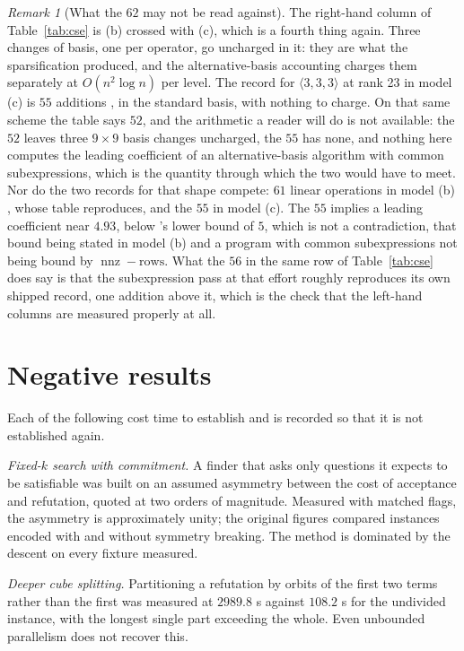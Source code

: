 \documentclass[11pt,reqno]{amsart}
\theoremstyle{plain}
\theoremstyle{definition}
\theoremstyle{remark}
\newtheorem{remark}[theorem]{Remark}
\newcommand{\nnz}{\operatorname{nnz}}
\begin{document}
\begin{remark}[What the $62$ may not be read against]
The right-hand column of Table~\ref{tab:cse} is (b) crossed with (c), which is a
fourth thing again. Three changes of basis, one per operator, go uncharged in it:
they are what the sparsification produced, and the alternative-basis accounting
charges them separately at $O(n^{2}\log n)$ per level. The record for
$\langle 3,3,3\rangle$ at rank 23 in model (c) is $55$ additions
\cite{karunaratne2026}, in the standard basis, with nothing to charge. On that
same scheme the table says $52$, and the arithmetic a reader will do is not
available: the $52$ leaves three $9\times 9$ basis changes uncharged, the $55$ has
none, and nothing here computes the leading coefficient of an alternative-basis
algorithm with common subexpressions, which is the quantity through which the two
would have to meet. Nor do the two records for that shape compete: $61$ linear
operations in model (b) \cite{beniamini2020}, whose table \cite{holtz2025}
reproduces, and the $55$ in model (c). The $55$ implies a leading coefficient
near $4.93$, below \cite{holtz2025}'s lower bound of $5$, which is not a
contradiction, that bound being stated in model (b) and a program with common
subexpressions not being bound by $\nnz-\mathrm{rows}$. What the $56$ in the same
row of Table~\ref{tab:cse} does say is that the subexpression pass at that effort
roughly reproduces its own shipped record, one addition above it, which is the
check that the left-hand columns are measured properly at all.
\end{remark}

\section{Negative results}\label{sec:neg}

Each of the following cost time to establish and is recorded so that it is not
established again.

\emph{Fixed-$k$ search with commitment.} A finder that asks only questions it
expects to be satisfiable was built on an assumed asymmetry between the cost of
acceptance and refutation, quoted at two orders of magnitude. Measured with
matched flags, the asymmetry is approximately unity; the original figures
compared instances encoded with and without symmetry breaking. The method is
dominated by the descent on every fixture measured.

\emph{Deeper cube splitting.} Partitioning a refutation by orbits of the first
two terms rather than the first was measured at $2989.8$ s against $108.2$ s for
the undivided instance, with the longest single part exceeding the whole. Even
unbounded parallelism does not recover this.
\end{document}
